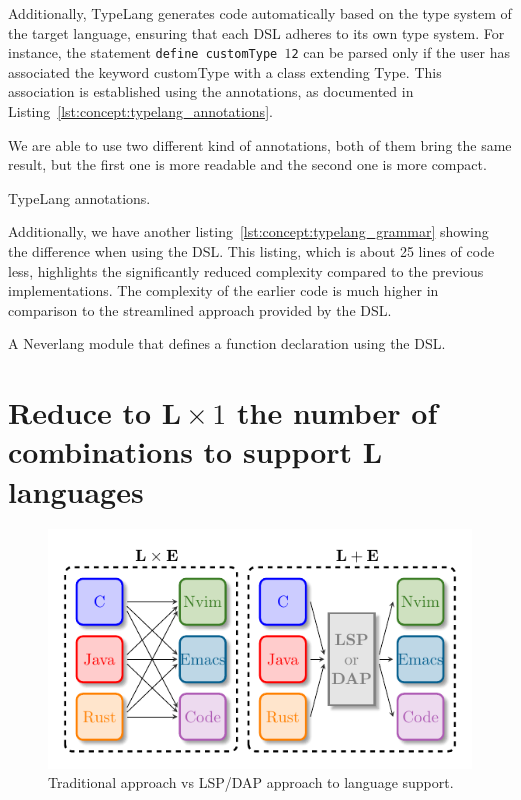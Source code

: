 Additionally, TypeLang generates code automatically based on the type system of the target language, ensuring that each DSL adheres to its own type system. For instance, the statement \texttt{define customType $1 $2} can be parsed only if the user has associated the keyword customType with a class extending Type. This association is established using the annotations, as documented in Listing~\ref{lst:concept:typelang_annotations}.

We are able to use two different kind of annotations, both of them bring the same result, but the first one is more readable and the second one is more compact.

\begin{Listing}
    \centering
    \caption{TypeLang annotations.}
    \label{lst:concept:typelang_annotations}
\end{Listing}

Additionally, we have another listing~\ref{lst:concept:typelang_grammar} showing the difference when using the DSL. This listing, which is about 25 lines of code less, highlights the significantly reduced complexity compared to the previous implementations. The complexity of the earlier code is much higher in comparison to the streamlined approach provided by the DSL.

\begin{Listing}
    \centering
    \caption{A Neverlang module that defines a function declaration using the DSL.}
    \label{lst:concept:fun_declaration_typecheck}
\end{Listing}

\section{Reduce to $\mathbf{L} \times 1$ the number of combinations to support $\mathbf{L}$ languages}

\begin{figure}[t]
    \centering
    \includegraphics[width=0.9\linewidth]{figs/concept/lsp_combinations.pdf}
    \caption{Traditional approach vs LSP/DAP approach to language support.}
    \label{lst:concept:lsp_combinations}
\end{figure}

